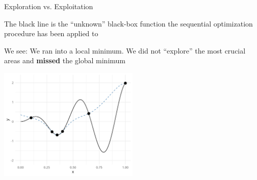 \documentclass[11pt,compress,t,notes=noshow, xcolor=table]{beamer}
\begin{document}
\begin{vbframe}{Exploration vs. Exploitation}

The black line is the \enquote{unknown} black-box function the sequential optimization procedure has been applied to

\vspace*{0.2cm} 
We see: We ran into a local minimum. We did not \enquote{explore} the most crucial areas and \textbf{missed} the global minimum

\vspace{+.45cm}

\begin{center}
  \includegraphics[width = 0.5\textwidth]{figure_man/loop_11.png}
\end{center}


\end{vbframe} 

\endlecture
\end{document}
